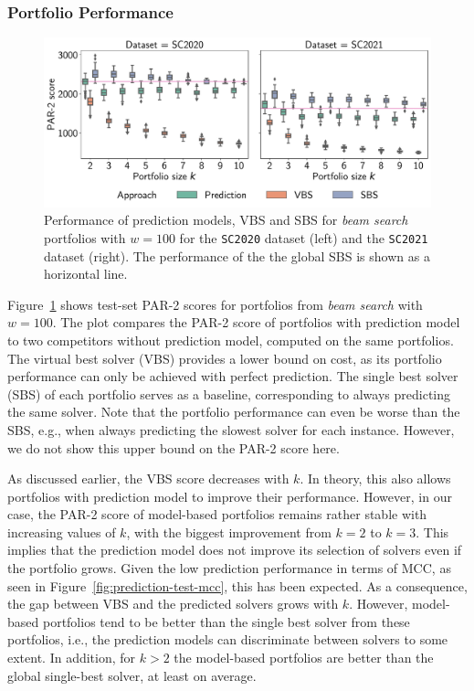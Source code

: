 \documentclass[runningheads]{llncs}
\begin{document}
\subsubsection{Portfolio Performance}

\begin{figure}[htb]
	\centering
	\includegraphics[width=\columnwidth]{plots/prediction-test-objective-beam.pdf}
	\caption{
		Performance of prediction models, VBS and SBS for \emph{beam search} portfolios with $w=100$ for the \texttt{SC2020} dataset (left) and the \texttt{SC2021} dataset (right).
		The performance of the the global SBS is shown as a horizontal line.}
	\label{fig:prediction-test-objective-beam}
\end{figure}

Figure~\ref{fig:prediction-test-objective-beam} shows test-set PAR-2 scores for portfolios from \emph{beam search} with $w=100$.
The plot compares the PAR-2 score of portfolios with prediction model to two competitors without prediction model, computed on the same portfolios.
The virtual best solver (VBS) provides a lower bound on cost, as its portfolio performance can only be achieved with perfect prediction.
The single best solver (SBS) of each portfolio serves as a baseline, corresponding to always predicting the same solver.
Note that the portfolio performance can even be worse than the SBS, e.g., when always predicting the slowest solver for each instance.
However, we do not show this upper bound on the PAR-2 score here.

As discussed earlier, the VBS score decreases with $k$.
In theory, this also allows portfolios with prediction model to improve their performance.
However, in our case, the \mbox{PAR-2} score of model-based portfolios remains rather stable with increasing values of $k$, with the biggest improvement from $k=2$ to $k=3$.
This implies that the prediction model does not improve its selection of solvers even if the portfolio grows.
Given the low prediction performance in terms of MCC, as seen in Figure~\ref{fig:prediction-test-mcc}, this has been expected.
As a consequence, the gap between VBS and the predicted solvers grows with $k$.
However, model-based portfolios tend to be better than the single best solver from these portfolios, i.e., the prediction models can discriminate between solvers to some extent.
In addition, for $k > 2$ the model-based portfolios are better than the global single-best solver, at least on average.
\end{document}

